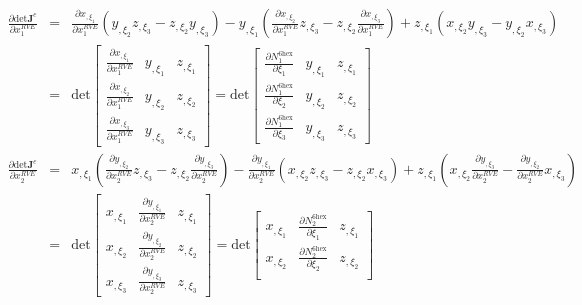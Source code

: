 \documentclass[12pt,aps,pre]{revtex4}
\begin{document}
\begin{eqnarray}
\frac{\partial \text{det}\pmb{J}^e}{\partial x_1^{RVE}} &=& \frac{\partial x_{,\xi_1}}{\partial x_1^{RVE}}\left(y_{,\xi_2}z_{,\xi_3} - z_{,\xi_2}y_{,\xi_3} \right) - y_{,\xi_1}\left(\frac{\partial x_{,\xi_2}}{\partial x_1^{RVE}}z_{,\xi_3}-z_{,\xi_2}\frac{\partial x_{,\xi_3}}{\partial x_1^{RVE}} \right) + z_{,\xi_1}\left(x_{,\xi_2}y_{,\xi_3}-y_{,\xi_2}x_{,\xi_3} \right) \nonumber\\
%
&=& \text{det} \begin{bmatrix}
\frac{\partial x_{,\xi_1}}{\partial x_1^{RVE}} & y_{,\xi_1} & z_{,\xi_1} \\
\frac{\partial x_{,\xi_2}}{\partial x_1^{RVE}} & y_{,\xi_2} & z_{,\xi_2} \\
\frac{\partial x_{,\xi_3}}{\partial x_1^{RVE}} & y_{,\xi_3} & z_{,\xi_3}
\end{bmatrix} 
%
= \text{det} \begin{bmatrix}
\frac{\partial N_1^{6\text{hex}}}{\partial \xi_1} & y_{,\xi_1} & z_{,\xi_1} \\
\frac{\partial N_1^{6\text{hex}}}{\partial \xi_2} & y_{,\xi_2} & z_{,\xi_2} \\
\frac{\partial N_1^{6\text{hex}}}{\partial \xi_3} & y_{,\xi_3} & z_{,\xi_3}
\end{bmatrix} \nonumber\\
\frac{\partial \text{det}\pmb{J}^e}{\partial x_2^{RVE}} &=& x_{,\xi_1}\left(\frac{\partial y_{,\xi_2}}{\partial x_2^{RVE}}z_{,\xi_3} - z_{,\xi_2}\frac{\partial y_{,\xi_3}}{\partial x_2^{RVE}} \right) - \frac{\partial y_{,\xi_1}}{\partial x_2^{RVE}}\left(x_{,\xi_2}z_{,\xi_3}-z_{,\xi_2}x_{,\xi_3} \right) + z_{,\xi_1}\left(x_{,\xi_2}\frac{\partial y_{,\xi_3}}{\partial x_2^{RVE}}-\frac{\partial y_{,\xi_2}}{\partial x_2^{RVE}}x_{,\xi_3} \right) \nonumber\\
%
&=& \text{det} \begin{bmatrix}
x_{,\xi_1} & \frac{\partial y_{,\xi_1}}{\partial x_2^{RVE}} & z_{,\xi_1} \\
x_{,\xi_2} & \frac{\partial y_{,\xi_2}}{\partial x_2^{RVE}} & z_{,\xi_2} \\
x_{,\xi_3} & \frac{\partial y_{,\xi_3}}{\partial x_2^{RVE}} & z_{,\xi_3}
\end{bmatrix} 
%
= \text{det} \begin{bmatrix}
x_{,\xi_1} & \frac{\partial N_2^{6\text{hex}}}{\partial \xi_1} & z_{,\xi_1} \\
x_{,\xi_2} & \frac{\partial N_2^{6\text{hex}}}{\partial \xi_2} & z_{,\xi_2} \\

\end{bmatrix}
\end{eqnarray}
\end{document}
